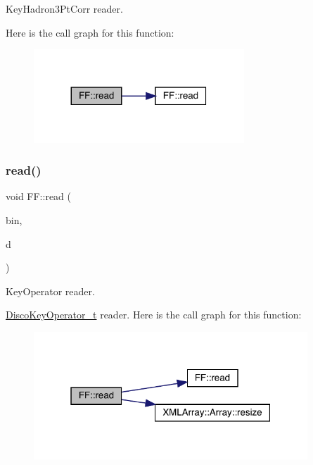 Key\+Hadron3\+Pt\+Corr reader. 

Here is the call graph for this function\+:
\nopagebreak
\begin{figure}[H]
\begin{center}
\leavevmode
\includegraphics[width=224pt]{d5/da6/namespaceFF_a457d1bd921b678eadc34fb2dbfcbdb32_cgraph}
\end{center}
\end{figure}
\mbox{\label{namespaceFF_a90d854af01e30d52191dff4341fcd4ad}} 
\subsubsection{\texorpdfstring{read()}{read()}\hspace{0.1cm}{\footnotesize\ttfamily [12/15]}}
{\footnotesize\ttfamily void F\+F\+::read (\begin{DoxyParamCaption}\item[{\mbox{\hyperlink{classADATIO_1_1BinaryReader}{Binary\+Reader}} \&}]{bin,  }\item[{\mbox{\hyperlink{structFF_1_1DiscoKeyOperator__t}{Disco\+Key\+Operator\+\_\+t}} \&}]{d }\end{DoxyParamCaption})}



Key\+Operator reader. 

\mbox{\hyperlink{structFF_1_1DiscoKeyOperator__t}{Disco\+Key\+Operator\+\_\+t}} reader. Here is the call graph for this function\+:
\nopagebreak
\begin{figure}[H]
\begin{center}
\leavevmode
\includegraphics[width=292pt]{d5/da6/namespaceFF_a90d854af01e30d52191dff4341fcd4ad_cgraph}
\end{center}
\end{figure}
\mbox{\label{namespaceFF_a7b6f77b4f2cff40fc56befd4b4c64b7d}} 
